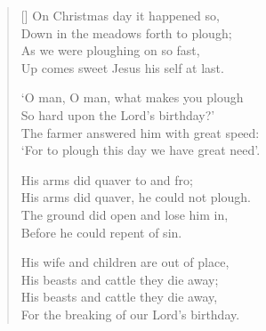 \settowidth{\versewidth}{Down in the meadows forth to plough;}


\begin{verse}[\versewidth]
On Christmas day it happened so,\\
Down in the meadows forth to plough;\\
As we were ploughing on so fast,\\
Up comes sweet Jesus his self at last.

`O man, O man, what makes you plough\\
So hard upon the Lord's birthday?'\\
The farmer answered him with great speed:\\
`For to plough this day we have great need'.

His arms did quaver to and fro;\\
His arms did quaver, he could not plough.\\
The ground did open and lose him in,\\
Before he could repent of sin.

His wife and children are out of place,\\
His beasts and cattle they die away;\\
His beasts and cattle they die away,\\
For the breaking of our Lord's birthday.
\end{verse}

